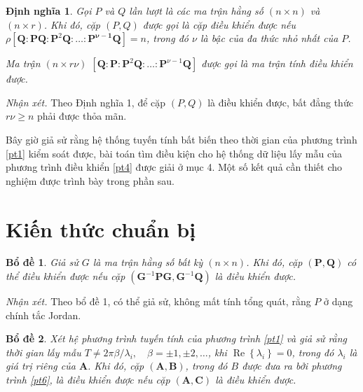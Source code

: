 \documentclass[12pt,a4paper]{article}
\newtheorem{dn}{Định nghĩa}
\newtheorem{bd}{Bổ đề}
\begin{document}

\begin{dn}\label{dn1}
	Gọi $P$ và $Q$ lần lượt là các ma trận hằng số $(n \times n)$ và $(n \times r)$. Khi đó, cặp $(P, Q)$ được gọi là cặp điều khiển được nếu $\rho\left[\mathbf{Q}: \mathbf{P} \mathbf{Q}: \mathbf{P}^2 \mathbf{Q} : \ldots: \mathbf{P}^{\boldsymbol{\nu}-\mathbf{1}} \mathbf{Q}\right]=n$, trong đó $\nu$ là bậc của đa thức nhỏ nhất của $ P$.
	
	Ma trận $(n \times r \nu)$ $\left[\mathbf{Q}: \mathbf{P}: \mathbf{P}^2 \mathbf{Q}: \ldots: \mathbf{P}^ {\nu-1} \mathbf{Q}\right]$ được gọi là ma trận tính điều khiển được.
\end{dn}



\textit{Nhận xét.} Theo Định nghĩa 1, để cặp $(P, Q)$ là điều khiển được, bất đẳng thức $r \nu \geqslant n$ phải được thỏa mãn.

Bây giờ giả sử rằng hệ thống tuyến tính bất biến theo thời gian của phương trình \eqref{pt1} kiểm soát được, bài toán tìm điều kiện cho hệ thống dữ liệu lấy mẫu của phương trình điều khiển \eqref{pt4}  được giải ở mục 4. Một số kết quả cần thiết cho nghiệm được trình bày trong phần sau.


\section{Kiến thức chuẩn bị}


\begin{bd}\label{bd1}
	Giả sử $G$ là ma trận hằng số bất kỳ $(n \times n)$. Khi đó, cặp $(\mathbf{P}, \mathbf{Q})$ có thể điều khiển được nếu cặp $\left(\mathbf{G}^{-1} \mathbf{P G}, \mathbf{G}^{-1} \mathbf{Q}\right)$ là điều khiển được.
\end{bd}


\textit{Nhận xét.} Theo bổ đề 1, có thể giả sử, không mất tính tổng quát, rằng $P$ ở dạng chính tắc Jordan.


\begin{bd}\label{bd2}
Xét hệ phương trình tuyến tính của phương trình \ref{pt1} và giả sử rằng thời gian lấy mẫu $T \neq 2 \pi \beta / \lambda_i, \quad \beta= \pm 1, \pm 2, \ldots$, khi $\operatorname{Re}\left\{ \lambda_i\right\}=0$, trong đó $\lambda_i$ là giá trị riêng của $\mathbf{A}$. Khi đó, cặp $(\mathbf{A}, \mathbf{B})$, trong đó $B$ được đưa ra bởi phương trình \ref{pt6}, là điều khiển được nếu cặp $(\mathbf{A}, \mathbf{C})$ là điều khiển được.	
\end{bd}
\end{document}

